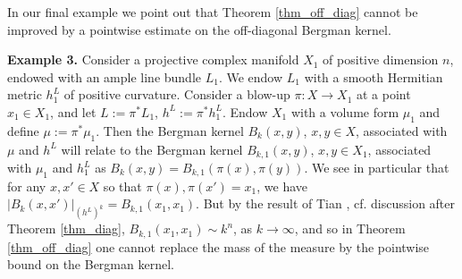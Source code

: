 \documentclass[12pt]{article}
\numberwithin{equation}{section}
\theoremstyle{theorem}
\theoremstyle{definition}
\theoremstyle{remark}
\begin{document}
	In our final example we point out that Theorem \ref{thm_off_diag} cannot be improved by a pointwise estimate on the off-diagonal Bergman kernel.
\par 
	\textbf{Example 3.}
	Consider a projective complex manifold $X_1$ of positive dimension $n$, endowed with an ample line bundle $L_1$.
	We endow $L_1$ with a smooth Hermitian metric $h^L_1$ of positive curvature.
	Consider a blow-up $\pi : X \to X_1$ at a point $x_1 \in X_1$, and let $L := \pi^* L_1$, $h^L := \pi^* h^L_1$.
	Endow $X_1$ with a volume form $\mu_1$ and define $\mu := \pi^* \mu_1$.
	Then the Bergman kernel $B_k(x, y)$, $x , y \in X$, associated with $\mu$ and $h^L$ will relate to the Bergman kernel $B_{k, 1}(x, y)$, $x , y \in X_1$, associated with $\mu_1$ and $h^L_1$ as $B_k(x, y) = B_{k, 1}(\pi(x), \pi(y))$.
	We see in particular that for any $x, x' \in X$ so that $\pi(x), \pi(x') = x_1$, we have $|B_k(x, x')|_{(h^L)^k} = B_{k, 1}(x_1, x_1)$.
	But by the result of Tian \cite{TianBerg}, cf. discussion after Theorem \ref{thm_diag}, $B_{k, 1}(x_1, x_1) \sim k^n$, as $k \to \infty$, and so in Theorem \ref{thm_off_diag} one cannot replace the mass of the measure by the pointwise bound on the Bergman kernel.
	
\end{document}
